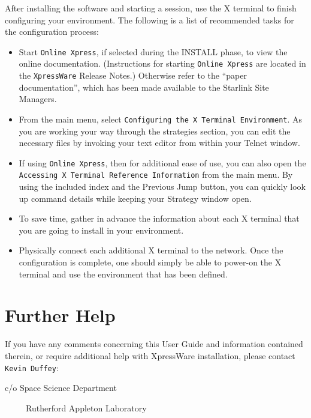 \documentclass[11pt]{article}
\begin{document}
After installing the software and starting a session, use the X terminal to
finish configuring your environment. The following is a list of recommended
tasks for the configuration process:

\begin {itemize}

\item Start {\tt Online Xpress}, if selected during the INSTALL phase, to view
the online documentation. (Instructions for starting {\tt Online Xpress} are
located in the {\tt XpressWare} Release Notes.) Otherwise refer to the ``paper
documentation'', which has been made available to the Starlink Site Managers.

\item From the main menu, select {\tt Configuring the X Terminal Environment}.
As you are working your way through the strategies section, you can edit the
necessary files by invoking your text editor from within your Telnet window.

\item If using {\tt Online Xpress}, then for additional ease of use, you can
also open the {\tt Accessing X Terminal Reference Information} from the main
menu. By using the included index and the Previous Jump button, you can quickly
look up command details while keeping your Strategy window open.

\item To save time, gather in advance the information about each X terminal
that you are going to install in your environment.

\item Physically connect each additional X terminal to the network. Once the
configuration is complete, one should simply be able to power-on the X terminal
and use the environment that has been defined.

\end {itemize}


\section {Further Help}

If you have any comments concerning this User Guide and information contained
therein, or require additional help with XpressWare installation, please
contact {\tt Kevin Duffey}:

c/o Space Science Department

\ \ \ \ \ Rutherford Appleton Laboratory
\end{document}
